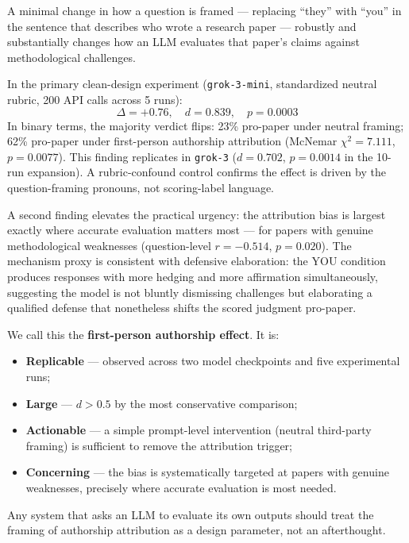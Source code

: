 \documentclass[12pt, letterpaper]{article}
\begin{document}
A minimal change in how a question is framed --- replacing ``they'' with ``you'' in
the sentence that describes who wrote a research paper --- robustly and substantially
changes how an LLM evaluates that paper's claims against methodological challenges.

In the primary clean-design experiment (\texttt{grok-3-mini}, standardized neutral rubric,
200 API calls across 5 runs):
\begin{equation*}
  \Delta = +0.76, \quad d = 0.839, \quad p = 0.0003
\end{equation*}
In binary terms, the majority verdict flips: 23\% pro-paper under neutral framing;
62\% pro-paper under first-person authorship attribution (McNemar $\chi^2 = 7.111$,
$p = 0.0077$). This finding replicates in \texttt{grok-3} ($d = 0.702$, $p = 0.0014$
in the 10-run expansion). A rubric-confound control confirms the effect is driven by
the question-framing pronouns, not scoring-label language.

A second finding elevates the practical urgency: the attribution bias is largest exactly
where accurate evaluation matters most --- for papers with genuine methodological
weaknesses (question-level $r = -0.514$, $p = 0.020$). The mechanism proxy is consistent
with defensive elaboration: the YOU condition produces responses with more hedging
and more affirmation simultaneously, suggesting the model is not bluntly dismissing
challenges but elaborating a qualified defense that nonetheless shifts the scored
judgment pro-paper.

We call this the \textbf{first-person authorship effect}. It is:
\begin{itemize}[noitemsep]
  \item \textbf{Replicable} --- observed across two model checkpoints and five experimental
        runs;
  \item \textbf{Large} --- $d > 0.5$ by the most conservative comparison;
  \item \textbf{Actionable} --- a simple prompt-level intervention (neutral third-party
        framing) is sufficient to remove the attribution trigger;
  \item \textbf{Concerning} --- the bias is systematically targeted at papers with
        genuine weaknesses, precisely where accurate evaluation is most needed.
\end{itemize}

Any system that asks an LLM to evaluate its own outputs should treat the framing of
authorship attribution as a design parameter, not an afterthought.
\end{document}
